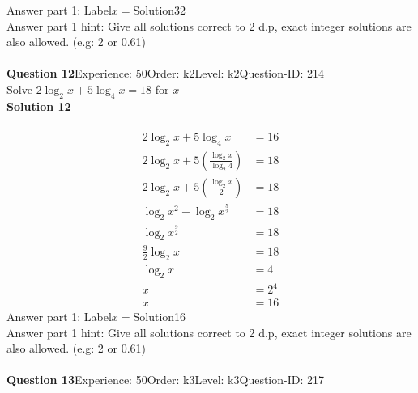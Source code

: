 \documentclass{article}
\begin{document}
Answer part 1: \hspace{10pt}Label\hspace{10pt}$x=$\hspace{10pt}Solution\hspace{10pt}32\\
Answer part 1 hint: \hspace{15pt}Give all solutions correct to 2 d.p, exact integer solutions are also allowed. (e.g: 2 or 0.61)\\
\\[4pt]
\noindent\textbf{Question 12}\hspace{20pt}Experience: 50\hspace{20pt}Order: k2\hspace{20pt}Level: k2\hspace{20pt}Question-ID: 214\\[2pt]
Solve $2\log_{2}x+5\log_{4}x=18$ for $x$\\[4pt]
\noindent\textbf{Solution 12}\\[2pt]
\\[-35pt]\begin{align*}
2\log_{2}x+5\log_{4}x&=16\\[2pt]
2\log_{2}x+5\left(\displaystyle\frac{\log_{2}x}{\log_{2}4}\right)&=18\\[2pt]
2\log_{2}x+5\left(\displaystyle\frac{\log_{2}x}{2}\right)&=18\\[2pt]
\log_{2}x^2+\log_{2}x^{\frac{5}{2}}&=18\\[2pt]
\log_{2}x^{\frac{9}{2}}&=18\\[2pt]
\displaystyle\frac{9}{2}\log_{2}x&=18\\[2pt]
\log_{2}x&=4\\[2pt]
x&=2^{4}\\[2pt]
x&=16
\end{align*}
Answer part 1: \hspace{10pt}Label\hspace{10pt}$x=$\hspace{10pt}Solution\hspace{10pt}16\\
Answer part 1 hint: \hspace{15pt}Give all solutions correct to 2 d.p, exact integer solutions are also allowed. (e.g: 2 or 0.61)\\
\\[4pt]
\noindent\textbf{Question 13}\hspace{20pt}Experience: 50\hspace{20pt}Order: k3\hspace{20pt}Level: k3\hspace{20pt}Question-ID: 217\\[2pt]
\end{document}
